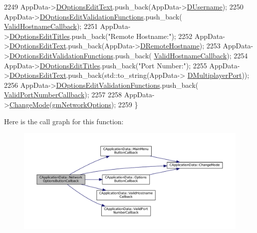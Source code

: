 \begin{DoxyCode}
2249     AppData->\hyperlink{classCApplicationData_a7044dc34cbd9d6776e8ef79eb12b5ce4}{DOptionsEditText}.push\_back(AppData->\hyperlink{classCApplicationData_aedfdb512317e5b62d0bbbcddcd48dfb8}{DUsername});
2250     AppData->\hyperlink{classCApplicationData_ab76fa444142de66fdb058f390e01112c}{DOptionsEditValidationFunctions}.push\_back(
      \hyperlink{classCApplicationData_aad04c7da1cc86bef623efda1019907fd}{ValidHostnameCallback});
2251     AppData->\hyperlink{classCApplicationData_a7a322ef6b8c1db3e995c6b493230fd05}{DOptionsEditTitles}.push\_back(\textcolor{stringliteral}{"Remote Hostname:"});
2252     AppData->\hyperlink{classCApplicationData_a7044dc34cbd9d6776e8ef79eb12b5ce4}{DOptionsEditText}.push\_back(AppData->\hyperlink{classCApplicationData_a09da79011ab5ce6d6108d1c20f0e7c69}{DRemoteHostname});
2253     AppData->\hyperlink{classCApplicationData_ab76fa444142de66fdb058f390e01112c}{DOptionsEditValidationFunctions}.push\_back(
      \hyperlink{classCApplicationData_aad04c7da1cc86bef623efda1019907fd}{ValidHostnameCallback});
2254     AppData->\hyperlink{classCApplicationData_a7a322ef6b8c1db3e995c6b493230fd05}{DOptionsEditTitles}.push\_back(\textcolor{stringliteral}{"Port Number:"});
2255     AppData->\hyperlink{classCApplicationData_a7044dc34cbd9d6776e8ef79eb12b5ce4}{DOptionsEditText}.push\_back(std::to\_string(AppData->
      \hyperlink{classCApplicationData_a99bed2c18513304de1cf2a2344bf091f}{DMultiplayerPort}));
2256     AppData->\hyperlink{classCApplicationData_ab76fa444142de66fdb058f390e01112c}{DOptionsEditValidationFunctions}.push\_back(
      \hyperlink{classCApplicationData_adc8125cc7c4ad01bdd43e6550c6ba133}{ValidPortNumberCallback});
2257 
2258     AppData->\hyperlink{classCApplicationData_aee18c113e9a0acb3cad3d63eb19de71b}{ChangeMode}(\hyperlink{classCApplicationData_ac8ac37a4c8bb871036fbbdc6a072e403a464109af3d31201d5dc8966512afd480}{gmNetworkOptions});
2259 \}
\end{DoxyCode}
Here is the call graph for this function\+:
\nopagebreak
\begin{figure}[H]
\begin{center}
\leavevmode
\includegraphics[width=350pt]{classCApplicationData_ad41dbc2f54ee638aa64a1d0c22b3fba9_cgraph}
\end{center}
\end{figure}

